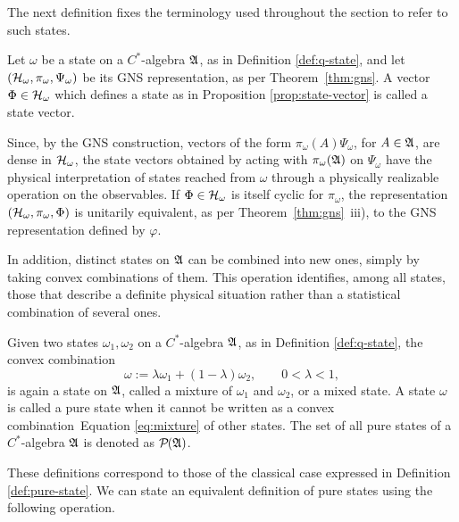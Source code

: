 \noindent The next definition fixes the terminology used throughout the section to refer to such states.

\begin{definition}
	\label{def:q-state-vector}
	Let $\omega$ be a state on a $C^*$-algebra $\mathfrak{A}$, as in Definition \ref{def:q-state}, and let $(\H_\omega, \pi_\omega, \Psi_\omega)$ be its GNS representation, as per Theorem~\ref{thm:gns}. A vector $\Phi \in \H_\omega$ which defines a state as in Proposition \ref{prop:state-vector} is called a state vector.
\end{definition}

\begin{remark}
	Since, by the GNS construction, vectors of the form $\pi_\omega(A)\Psi_\omega$, for $A \in \mathfrak{A}$, are dense in $\H_\omega$, the state vectors obtained by acting with $\pi_\omega(\mathfrak{A})$ on $\Psi_\omega$ have the physical interpretation of states reached from $\omega$ through a physically realizable operation on the observables. If $\Phi \in \H_\omega$ is itself cyclic for $\pi_\omega$, the representation $(\H_\omega, \pi_\omega, \Phi)$ is unitarily equivalent, as per Theorem~\ref{thm:gns}~iii), to the GNS representation defined by $\varphi$.
\end{remark}

In addition, distinct states on $\mathfrak{A}$ can be combined into new ones, simply by taking convex combinations of them. This operation identifies, among all states, those that describe a definite physical situation rather than a statistical combination of several ones.

\begin{definition}
	\label{def:pure-mixed-state}
	Given two states $\omega_1,\omega_2$ on a $C^*$-algebra $\mathfrak{A}$, as in Definition \ref{def:q-state}, the convex combination
	\begin{equation}
		\label{eq:mixture}
		\omega := \lambda\omega_1 + (1-\lambda)\omega_2, \qquad 0 < \lambda < 1,
	\end{equation}
	is again a state on $\mathfrak{A}$, called a mixture of $\omega_1$ and $\omega_2$, or a mixed state. A state $\omega$ is called a pure state when it cannot be written as a convex combination~Equation \eqref{eq:mixture} of other states. The set of all pure states of a $C^*$-algebra $\mathfrak{A}$ is denoted as $\mathcal{P}(\A)$.
\end{definition}

These definitions correspond to those of the classical case expressed in Definition \ref{def:pure-state}. We can state an equivalent definition of pure states using the following operation.

